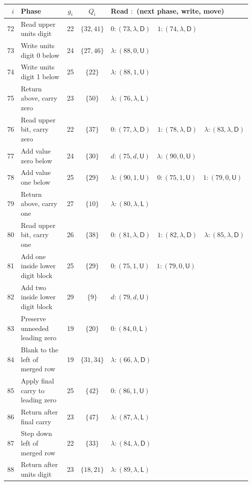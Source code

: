 \documentclass[11pt,a4paper]{article}
\newcommand{\blank}{\lambda}
\newcommand{\triple}[3]{(#1,#2,\mathsf{#3})}
\begin{document}
\begin{center}
\fontsize{9.2}{11}\selectfont\renewcommand{\arraystretch}{1.21}
\setlength{\tabcolsep}{4pt}
\begin{tabularx}{\textwidth}{r p{5.5cm} c c X}
\toprule\rowcolor{Pale}$i$ & Phase & $g_i$ & $Q_i$ & Read $:$ (next phase, write, move)\\\midrule
72 & Read upper units digit & 22 & $\{32,41\}$ & $0:\triple{73}{\blank}{D}\quad 1:\triple{74}{\blank}{D}$ \\
73 & Write units digit 0 below & 24 & $\{27,46\}$ & $\blank:\triple{88}{0}{U}$ \\
74 & Write units digit 1 below & 25 & $\{22\}$ & $\blank:\triple{88}{1}{U}$ \\
75 & Return above, carry zero & 23 & $\{50\}$ & $\blank:\triple{76}{\blank}{L}$ \\
76 & Read upper bit, carry zero & 22 & $\{37\}$ & $0:\triple{77}{\blank}{D}\quad 1:\triple{78}{\blank}{D}\quad \blank:\triple{83}{\blank}{D}$ \\
77 & Add value zero below & 24 & $\{30\}$ & $d:\triple{75}{d}{U}\quad \blank:\triple{90}{0}{U}$ \\
78 & Add value one below & 25 & $\{29\}$ & $\blank:\triple{90}{1}{U}\quad 0:\triple{75}{1}{U}\quad 1:\triple{79}{0}{U}$ \\
79 & Return above, carry one & 27 & $\{10\}$ & $\blank:\triple{80}{\blank}{L}$ \\
80 & Read upper bit, carry one & 26 & $\{38\}$ & $0:\triple{81}{\blank}{D}\quad 1:\triple{82}{\blank}{D}\quad \blank:\triple{85}{\blank}{D}$ \\
81 & Add one inside lower digit block & 25 & $\{29\}$ & $0:\triple{75}{1}{U}\quad 1:\triple{79}{0}{U}$ \\
82 & Add two inside lower digit block & 29 & $\{9\}$ & $d:\triple{79}{d}{U}$ \\
83 & Preserve unneeded leading zero & 19 & $\{20\}$ & $0:\triple{84}{0}{L}$ \\
84 & Blank to the left of merged row & 19 & $\{31,34\}$ & $\blank:\triple{66}{\blank}{D}$ \\
85 & Apply final carry to leading zero & 25 & $\{42\}$ & $0:\triple{86}{1}{U}$ \\
86 & Return after final carry & 23 & $\{47\}$ & $\blank:\triple{87}{\blank}{L}$ \\
87 & Step down left of merged row & 22 & $\{33\}$ & $\blank:\triple{84}{\blank}{D}$ \\
88 & Return after units digit & 23 & $\{18,21\}$ & $\blank:\triple{89}{\blank}{L}$ \\

\end{tabularx}
\end{center}
\end{document}
